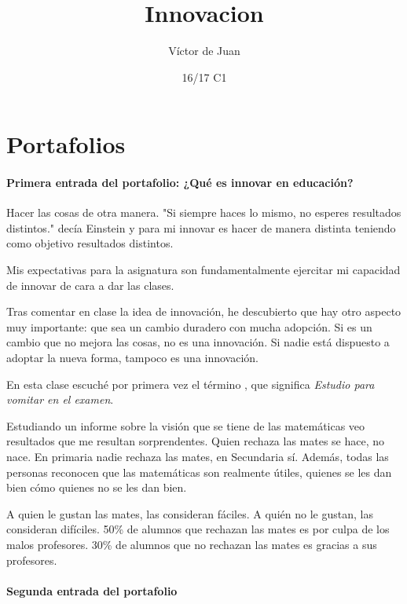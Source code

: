 \documentclass[palatino,nochap]{apuntes}
\title{Innovacion}
\author{Víctor de Juan}
\date{16/17 C1}
\begin{document}
\pagestyle{plain}
\maketitle

\tableofcontents
\newpage

\section{Portafolios}

\paragraph{Primera entrada del portafolio: ¿Qué es innovar en educación?}

Hacer las cosas de otra manera. "Si siempre haces lo mismo, no esperes resultados distintos." decía Einstein y para mi innovar es hacer de manera distinta teniendo como objetivo resultados distintos.

Mis expectativas para la asignatura son fundamentalmente ejercitar mi capacidad de innovar de cara a dar las clases. 

Tras comentar en clase la idea de innovación, he descubierto que hay otro aspecto muy importante: que sea un cambio duradero con mucha adopción.
%
Si es un cambio que no mejora las cosas, no es una innovación. 
%
Si nadie está dispuesto a adoptar la nueva forma, tampoco es una innovación.

En esta clase escuché por primera vez el término , que significa \textit{Estudio para vomitar en el examen}.



Estudiando un informe sobre la visión que se tiene de las matemáticas veo resultados que me resultan sorprendentes. 
%
Quien rechaza las mates se hace, no nace. En primaria nadie rechaza las mates, en Secundaria sí.
%
Además, todas las personas reconocen que las matemáticas son realmente útiles, quienes se les dan bien cómo quienes no se les dan bien.

A quien le gustan las mates, las consideran fáciles. A quién no le gustan, las consideran difíciles. 50\% de alumnos que rechazan las mates es por culpa de los malos profesores. 30\% de alumnos que no rechazan las mates es gracias a sus profesores. 


\paragraph{Segunda entrada del portafolio}
\end{document}
